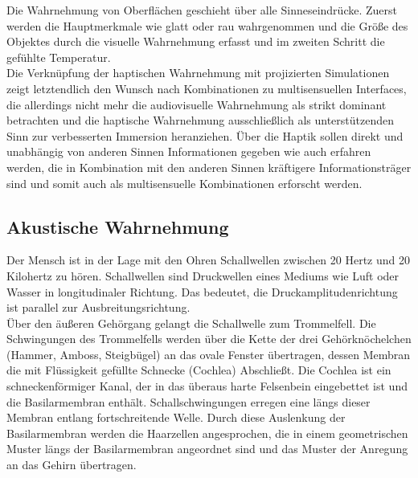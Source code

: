 Die Wahrnehmung von Oberflächen geschieht über alle Sinneseindrücke. Zuerst werden die Hauptmerkmale wie glatt oder rau wahrgenommen und die Größe des Objektes durch die visuelle Wahrnehmung erfasst und im zweiten Schritt die gefühlte Temperatur. \cite[Vgl. Seite 33]{Sprenger.2020}\\
\glqq Die Verknüpfung der haptischen Wahrnehmung mit projizierten Simulationen zeigt letztendlich den Wunsch nach Kombinationen zu multisensuellen Interfaces, die allerdings nicht mehr die audiovisuelle Wahrnehmung als strikt dominant betrachten und die haptische Wahrnehmung ausschließlich als unterstützenden Sinn zur verbesserten Immersion heranziehen. Über die Haptik sollen direkt und unabhängig von anderen Sinnen Informationen gegeben wie auch erfahren werden, die in Kombination mit den anderen Sinnen kräftigere Informationsträger sind und somit auch als multisensuelle Kombinationen erforscht werden. \grqq{} \cite[Seite 263]{Sprenger.2020}
\subsection{Akustische Wahrnehmung}
Der Mensch ist in der Lage mit den Ohren Schallwellen zwischen 20 Hertz und 20 Kilohertz zu hören. Schallwellen sind Druckwellen eines Mediums wie Luft oder Wasser in longitudinaler Richtung. Das bedeutet, die Druckamplitudenrichtung ist parallel zur Ausbreitungsrichtung. \cite[Vgl. Seite 217]{Schonhammer.2013} \\
\glqq Über den äußeren Gehörgang gelangt die Schallwelle zum Trommelfell. Die Schwingungen des Trommelfells werden über die Kette der drei Gehörknöchelchen (Hammer, Amboss, Steigbügel) an das ovale Fenster übertragen, dessen Membran die mit Flüssigkeit gefüllte Schnecke (Cochlea) Abschließt. Die Cochlea ist ein schneckenförmiger Kanal, der in das überaus harte Felsenbein eingebettet ist und die Basilarmembran enthält. Schallschwingungen erregen eine längs dieser Membran entlang fortschreitende Welle. Durch diese Auslenkung der Basilarmembran werden die Haarzellen angesprochen, die in einem geometrischen Muster längs der Basilarmembran angeordnet sind und das Muster der Anregung an das Gehirn übertragen. \grqq{} \cite[Seite 71f.]{Bernstein.2019}

